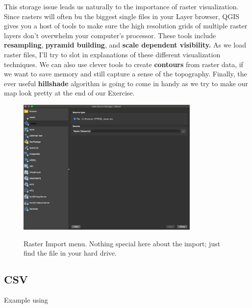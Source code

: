 \documentclass{article}
\begin{document}
This storage issue leads us naturally to the importance of raster visualization. Since rasters will often bu the biggest single files in your Layer browser, QGIS gives you a host of tools to make sure the high resolution grids of multiple raster layers don't overwhelm your computer's processor. These tools include \textbf{resampling}, \textbf{pyramid building}, and \textbf{scale dependent visibility.} As we load raster files, I'll try to slot in explanations of these different visualization techniques. We can also use clever tools to create \textbf{contours} from raster data, if we want to save memory and still capture a sense of the topography. Finally, the ever useful \textbf{hillshade} algorithm is going to come in handy as we try to make our map look pretty at the end of our Exercise. 

\begin{figure}[htbp]
    \centering
    \includegraphics[width=0.8\textwidth]{Fig_12_Raster.png}
    \label{fig12}
    \caption{Raster Import menu. Nothing special here about the import; just find the file in your hard drive.}
\end{figure}

\subsection{CSV}

Example using 
\end{document}
